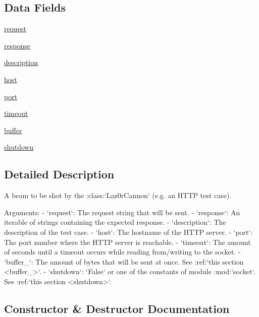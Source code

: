 \subsection*{Data Fields}
\begin{DoxyCompactItemize}
\item 
\hyperlink{classpewpewlaz0rt4nk_1_1_beam_a51e6a0d2bcb8531a5e5adcd66a77aa3b}{request}
\item 
\hyperlink{classpewpewlaz0rt4nk_1_1_beam_a8ab7bcb35ce5bba05608c72da6b4a0d3}{response}
\item 
\hyperlink{classpewpewlaz0rt4nk_1_1_beam_a2661f439a4a94ffdcd5e47ae1da0bb1d}{description}
\item 
\hyperlink{classpewpewlaz0rt4nk_1_1_beam_a832ddc04754e8a43d4f3c6165b1294a7}{host}
\item 
\hyperlink{classpewpewlaz0rt4nk_1_1_beam_af8fb0f45ee0195c7422a49e6a8d72369}{port}
\item 
\hyperlink{classpewpewlaz0rt4nk_1_1_beam_aee145bfca8e9b2eaf3cd3c47157be9a3}{timeout}
\item 
\hyperlink{classpewpewlaz0rt4nk_1_1_beam_a38acb51b2a63fccbafac9c0afca0c1b9}{buffer}
\item 
\hyperlink{classpewpewlaz0rt4nk_1_1_beam_aa4a2d3facfe7f685ce8fdb8fdf68ac44}{shutdown}
\end{DoxyCompactItemize}


\subsection{Detailed Description}
\begin{DoxyVerb}A beam to be shot by the :class:`Laz0rCannon` (e.g. an HTTP test case).

Arguments:
    - `request`: The request string that will be sent.
    - `response`: An iterable of strings containing the expected
      response.
    - `description`: The description of the test case.
    - `host`: The hostname of the HTTP server.
    - `port`: The port number where the HTTP server is reachable.
    - `timeout`: The amount of seconds until a timeout occurs while
       reading from/writing to the socket.
    - `buffer_`: The amount of bytes that will be sent at once. See
      :ref:`this section <buffer_>`.
    - `shutdown`: `False` or one of the constants of module
      :mod:`socket`. See :ref:`this section <shutdown>`.
\end{DoxyVerb}
 

\subsection{Constructor \& Destructor Documentation}
\mbox{\label{classpewpewlaz0rt4nk_1_1_beam_ab990f1d831d1f24fff891d8726d10300}} 
